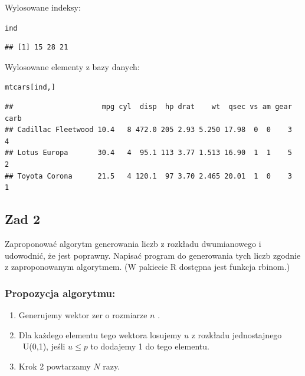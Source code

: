 \documentclass[12pt]{mwart}\usepackage[]{graphicx}\usepackage[]{color}
\makeatletter
\newcommand{\hlstd}[1]{\textcolor[rgb]{0.345,0.345,0.345}{#1}}%
\newenvironment{kframe}{%
 \def\at@end@of@kframe{}%
 \ifinner\ifhmode%
  \def\at@end@of@kframe{\end{minipage}}%
  \begin{minipage}{\columnwidth}%
 \fi\fi%
 \def\FrameCommand##1{\hskip\@totalleftmargin \hskip-\fboxsep
 \colorbox{shadecolor}{##1}\hskip-\fboxsep
     \hskip-\linewidth \hskip-\@totalleftmargin \hskip\columnwidth}%
 \MakeFramed {\advance\hsize-\width
   \@totalleftmargin\z@ \linewidth\hsize
   \@setminipage}}%
 {\par\unskip\endMakeFramed%
 \at@end@of@kframe}
\newenvironment{knitrout}{}{} %
\makeatother
\begin{document}
Wylosowane indeksy:
\begin{knitrout}
\color{fgcolor}\begin{kframe}
\begin{alltt}
\hlstd{ind}
\end{alltt}
\begin{verbatim}
## [1] 15 28 21
\end{verbatim}
\end{kframe}
\end{knitrout}
Wylosowane elementy z bazy danych:
\begin{knitrout}\small
{}\color{fgcolor}\begin{kframe}
\begin{alltt}
\hlstd{mtcars[ind,]}
\end{alltt}
\begin{verbatim}
##                     mpg cyl  disp  hp drat    wt  qsec vs am gear carb
## Cadillac Fleetwood 10.4   8 472.0 205 2.93 5.250 17.98  0  0    3    4
## Lotus Europa       30.4   4  95.1 113 3.77 1.513 16.90  1  1    5    2
## Toyota Corona      21.5   4 120.1  97 3.70 2.465 20.01  1  0    3    1
\end{verbatim}
\end{kframe}
\end{knitrout}

\newpage
\subsection*{Zad 2}
Zaproponować algorytm generowania liczb z rozkładu dwumianowego i udowodnić,
że jest poprawny. Napisać program do generowania tych liczb zgodnie z zaproponowanym algorytmem. (W pakiecie R dostępna jest funkcja rbinom.)
\subsubsection*{Propozycja algorytmu:}
  \begin{enumerate}
    \item Generujemy wektor zer o rozmiarze $n$ .
    \item Dla każdego elementu tego wektora losujemy $u$ z rozkładu jednostajnego ~U(0,1), jeśli  $u \leq p$ to dodajemy 1 do tego elementu.
    \item Krok 2 powtarzamy $N$ razy.
    \newline
  \end{enumerate}
\end{document}

